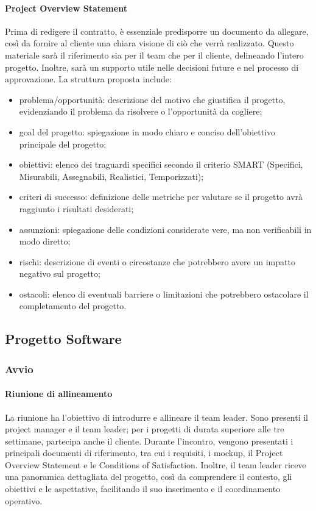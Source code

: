         \paragraph{Project Overview Statement}
        Prima di redigere il contratto, è essenziale predisporre un documento da allegare, così da fornire al cliente una chiara
        visione di ciò che verrà realizzato. Questo materiale sarà il riferimento sia per il team che per il cliente, delineando
        l’intero progetto. Inoltre, sarà un supporto utile nelle decisioni future e nel processo di approvazione. La struttura proposta include:
        \begin{itemize}
            \item problema/opportunità: descrizione del motivo che giustifica il progetto, evidenziando il problema da risolvere o l'opportunità da cogliere;
            \item goal del progetto: spiegazione in modo chiaro e conciso dell'obiettivo principale del progetto;
            \item obiettivi: elenco dei traguardi specifici secondo il criterio SMART (Specifici, Misurabili, Assegnabili, Realistici, Temporizzati);
            \item criteri di successo: definizione delle metriche per valutare se il progetto avrà raggiunto i risultati desiderati;
            \item assunzioni: spiegazione delle condizioni considerate vere, ma non verificabili in modo diretto;
            \item rischi: descrizione di eventi o circostanze che potrebbero avere un impatto negativo sul progetto;
            \item ostacoli: elenco di eventuali barriere o limitazioni che potrebbero ostacolare il completamento del progetto.
        \end{itemize}

    \subsection{Progetto Software}
        \subsubsection{Avvio}
            \paragraph{Riunione di allineamento}
            La riunione ha l’obiettivo di introdurre e allineare il team leader. Sono
            presenti il project manager e il team leader; per i progetti di durata superiore alle tre settimane, partecipa
            anche il cliente.
            Durante l’incontro, vengono presentati i principali documenti di riferimento, tra cui i requisiti, i mockup,
            il Project Overview Statement e le Conditions of Satisfaction. Inoltre, il team leader riceve una panoramica
            dettagliata del progetto, così da comprendere il contesto, gli obiettivi e le aspettative, facilitando il
            suo inserimento e il coordinamento operativo.

